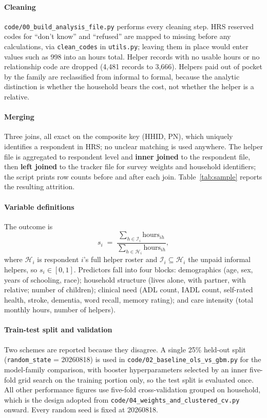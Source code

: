 \documentclass[9pt,twoside]{pnas-new}
\begin{document}
\paragraph{Cleaning} \texttt{code/00\_build\_analysis\_file.py} performs every
cleaning step. HRS reserved codes for ``don't know'' and ``refused'' are mapped
to missing before any calculations, via \texttt{clean\_codes} in
\texttt{utils.py}; leaving them in place would enter values such as 998 into an
hours total. Helper records with no usable hours or no relationship code are
dropped (4{,}481 records to 3{,}666). Helpers paid out of pocket by the family
are reclassified from informal to formal, because the analytic distinction is
whether the household bears the cost, not whether the helper is a relative.

\paragraph{Merging} Three joins, all exact on the composite key
(HHID, PN), which uniquely identifies a respondent in HRS; no unclear matching is
used anywhere. The helper file is aggregated to respondent level and
\textbf{inner joined} to the respondent file, then \textbf{left joined} to the
tracker file for survey weights and household identifiers; the script prints row
counts before and after each join. Table~\ref{tab:sample} reports the resulting
attrition.

\paragraph{Variable definitions} The outcome is
\begin{equation}
\label{eq:outcome}
s_i \;=\; \frac{\sum_{h \in \mathcal{I}_i} \text{hours}_{ih}}{\sum_{h \in \mathcal{H}_i} \text{hours}_{ih}},
\end{equation}
where $\mathcal{H}_i$ is respondent $i$'s full helper roster and
$\mathcal{I}_i \subseteq \mathcal{H}_i$ the unpaid informal helpers, so
$s_i \in [0,1]$. Predictors fall into four blocks: demographics (age, sex, years
of schooling, race); household structure (lives alone, with partner, with
relative; number of children); clinical need (ADL count, IADL count,
self-rated health, stroke, dementia, word recall, memory rating); and care
intensity (total monthly hours, number of helpers).

\paragraph{Train-test split and validation} Two schemes are reported because
they disagree. A single 25\% held-out split (\texttt{random\_state} =
20260818) is used in \texttt{code/02\_baseline\_ols\_vs\_gbm.py} for the
model-family comparison, with booster hyperparameters selected by an inner
five-fold grid search on the training portion only, so the test split is evaluated
once. All other performance figures use five-fold cross-validation
grouped on household, which is the design adopted from
\texttt{code/04\_weights\_and\_clustered\_cv.py} onward. Every random seed is
fixed at 20260818.
\end{document}
